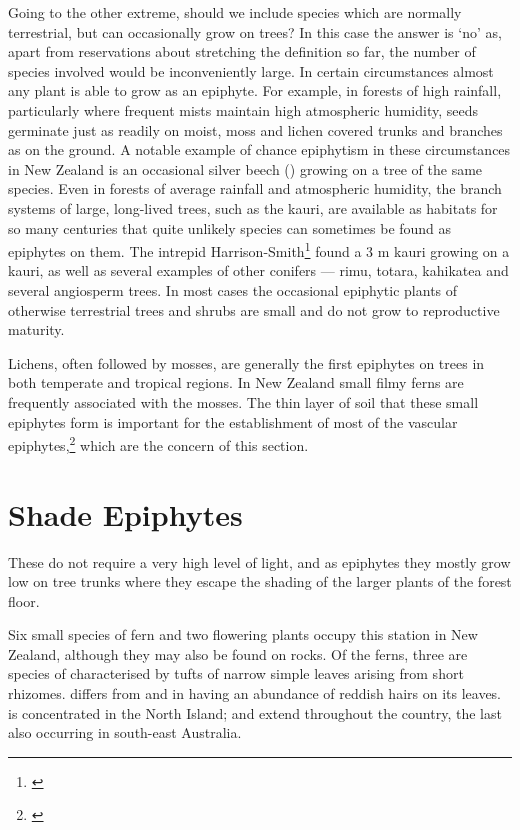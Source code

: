Going to the other extreme, should we include species which are normally terrestrial, but can occasionally grow on trees? In this case the answer is `no' as, apart from reservations about stretching the definition so far, the number of species involved would be inconveniently large.
In certain circumstances almost any plant is able to grow as an epiphyte.
For example, in forests of high rainfall, particularly where frequent mists maintain high atmospheric humidity, seeds germinate just as readily on moist, moss and lichen covered trunks and branches as on the ground.
A notable example of chance epiphytism in these circumstances in New Zealand is an occasional silver beech () growing on a tree of the same species.
Even in forests of average rainfall and atmospheric humidity, the branch systems of large, long-lived trees, such as the kauri, are available as habitats for so many centuries that quite unlikely species can sometimes be found as epiphytes on them.
The intrepid Harrison-Smith\footnote{\cite{harrisonsmith1938kauri}} found a 3 m kauri growing on a kauri, as well as several examples of other conifers — rimu, totara, kahikatea and several angiosperm trees.
In most cases the occasional epiphytic plants of otherwise terrestrial trees and shrubs are small and do not grow to reproductive maturity.

Lichens, often followed by mosses, are generally the first epiphytes on trees in both temperate and tropical regions.
In New Zealand small filmy ferns are frequently associated with the mosses.
The thin layer of soil that these small epiphytes form is important for the establishment of most of the vascular epiphytes,\footnote{\cite{oliver1930new}} which are the concern of this section.

\section{Shade Epiphytes}

These do not require a very high level of light, and as epiphytes they mostly grow low on tree trunks where they escape the shading of the larger plants of the forest floor.

Six small species of fern and two flowering plants occupy this station in New Zealand, although they may also be found on rocks.
Of the ferns, three are species of  characterised by tufts of narrow simple leaves arising from short rhizomes.  differs from  and  in having an abundance of reddish hairs on its leaves.  is concentrated in the North Island;  and  extend throughout the country, the last also occurring in south-east Australia.

